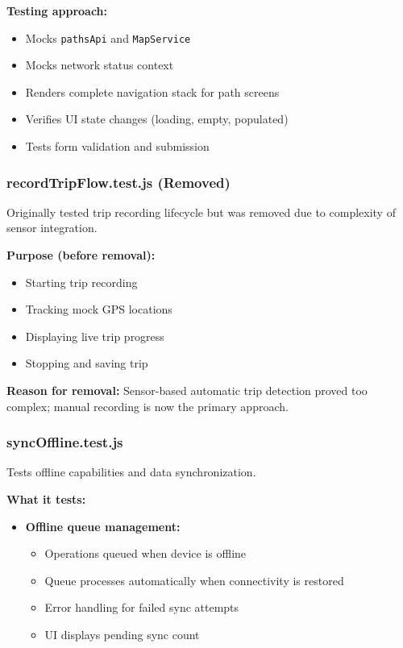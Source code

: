 \textbf{Testing approach:}
\begin{itemize}
    \item Mocks \texttt{pathsApi} and \texttt{MapService}
    \item Mocks network status context
    \item Renders complete navigation stack for path screens
    \item Verifies UI state changes (loading, empty, populated)
    \item Tests form validation and submission
\end{itemize}

\subsubsection{recordTripFlow.test.js (Removed)}
\label{subsubsec:record_trip_flow_test}

Originally tested trip recording lifecycle but was removed due to complexity of sensor integration.

\textbf{Purpose (before removal):}
\begin{itemize}
    \item Starting trip recording
    \item Tracking mock GPS locations
    \item Displaying live trip progress
    \item Stopping and saving trip
\end{itemize}

\textbf{Reason for removal:} Sensor-based automatic trip detection proved too complex; manual recording is now the primary approach.

\subsubsection{syncOffline.test.js}
\label{subsubsec:sync_offline_test}

Tests offline capabilities and data synchronization.

\textbf{What it tests:}
\begin{itemize}
    \item \textbf{Offline queue management:}
    \begin{itemize}
        \item Operations queued when device is offline
        \item Queue processes automatically when connectivity is restored
        \item Error handling for failed sync attempts
        \item UI displays pending sync count
    \end{itemize}
\end{itemize}

